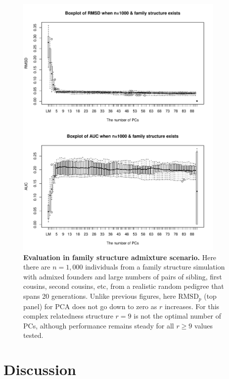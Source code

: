 \documentclass[11pt]{article}
\newcommand{\rmsd}{\text{RMSD}_p}
\begin{document}
\begin{figure}[bp!]
  \centering
  \includegraphics[width=4in]{PCA_n_1000_m_100_family_structure.pdf}
  \caption{
    {\bf Evaluation in family structure admixture scenario.}
    Here there are $n = 1,000$ individuals from a family structure simulation with admixed founders and large numbers of pairs of sibling, first cousins, second cousins, etc, from a realistic random pedigree that spans 20 generations.
    Unlike previous figures, here $\rmsd$ (top panel) for PCA does not go down to zero as $r$ increases.
    For this complex relatedness structure $r = 9$ is not the optimal number of PCs, although performance remains steady for all $r \ge 9$ values tested.
  }
  \label{fig:family_structure}
\end{figure}

\section{Discussion}

\end{document}
